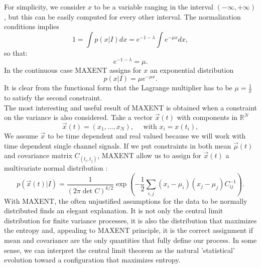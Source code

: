 \documentclass[twocolumn,showpacs,preprintnumbers,nofootinbib,prd,
superscriptaddress,10pt]{revtex4-1}
\begin{document}
For simplicity, we consider $x$ to be a variable ranging in the interval $(-\infty,+\infty)$, but this can be easily computed for every other interval. The normalization conditions implies 
\begin{equation}\nonumber 
   1 =  \int p(x \vert I) dx = e^{-1-\lambda}\int e^{-\mu x} dx, 
\end{equation}
so that: 
\begin{equation}\nonumber 
    e^{-1 -\lambda} = \mu.
\end{equation}
In the continuous case MAXENT assigns for $x$ an exponential distribution
\begin{equation}
    p(x \vert I) = \mu e^{-\mu x}. \nonumber 
\end{equation}
It is clear from the functional form that the Lagrange multiplier has to be $\mu = \frac{1}{\bar x}$ to satisfy the second constraint. \\ 
The most interesting and useful result of MAXENT is obtained when a constraint on the variance is also considered. Take a vector  $\vec x(t)$ with components in $\mathbb{R}^N$
\begin{equation*}
    \vec x(t) = \left(x_1, \dots, x_N \right), \quad \text{ with } x_i = x(t_i),
\end{equation*}
We assume $\vec x$ to be time dependent and real valued because we will work with time dependent single channel signals. If we put constraints in both mean $\vec \mu(t)$ and covariance matrix $C_(t_i, t_j)$, MAXENT allow us to assign for $\vec x(t)$ a multivariate normal distribution \cite{gregory_2005}: 
\begin{equation}
    p\left(\vec x(t)\vert I\right) = 
    \frac{1}{\left(2 \pi \det C\right)^{k / 2}}\exp\left(-\frac{1}{2}\sum_{i,j}(x_i-\mu_i) (x_j-\mu_j)C^{-1}_{ij} \right). 
\end{equation}
With MAXENT, the often unjustified assumptions for the data to be normally distributed finds an elegant explanation. It is not only the central limit distribution for finite variance processes, it is also the distribution that maximizes the entropy and, appealing to MAXENT principle, it is the correct assignment if mean and covariance are the only quantities that fully define our process. In some sense, we can interpret the central limit theorem as the natural 'statistical' evolution toward a configuration that maximizes entropy. 
\end{document}
